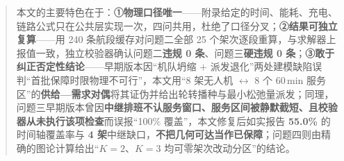 \begin{abstract}
	本文的主要特色在于：\textbf{①物理口径唯一}——附录给定的时间、能耗、充电、链路公式只在公共层实现一次，四问共用，杜绝了口径分叉；\textbf{②结果可独立复算}——用 240 条航段缓存对问题二全部 25 个架次逐段重算，与求解器上报值一致，独立校验器确认问题二\textbf{违规 0 条}、问题三\textbf{硬违规 0 条}；\textbf{③敢于纠正否定性结论}——早期版本因“机队坍缩 $+$ 派发退化”两处建模缺陷误判“首批保障时限物理不可行”，本文用“8 架无人机 $\leftrightarrow$ 8 个 60\,min 服务区”的\textbf{供给—需求对偶}将其证伪并给出轮转播种与最小松弛量派发；同理，问题三早期版本曾因\textbf{中继排班不认服务窗口、服务区间被静默截短、且校验器从未执行该项检查}而误报“100\% 覆盖”，本文修复后如实报告 \textbf{55.0\%} 的时间轴覆盖率与 \textbf{4 架}中继缺口，\textbf{不把几何可达当作已保障}；问题四则由精确的图论计算给出“$K=2$、$K=3$ 均可零架次改动分区”的结论。

\end{abstract}
